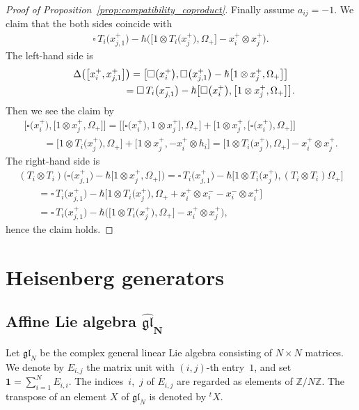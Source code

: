 \documentclass[pdftex]{sigma}
\theoremstyle{definition}
\numberwithin{equation}{section}
\newcommand{\bbZ}{\mathbb{Z}}
\newcommand{\gl}{\mathfrak{gl}}
\newcommand{\bfid}{\mathbf{1}}
\begin{document}
\begin{proof}[Proof of Proposition~\ref{prop:compatibility_coproduct}]
Finally assume $a_{ij}=-1$. We claim that the both sides coincide with
\begin{gather*}
\square\,T_i\big(x_{j,1}^+\big) -\hbar \big(\big[1 \otimes T_i\big(x_j^+\big), \Omega_+\big] - x_i^+ \otimes x_j^+\big).
\end{gather*}
The left-hand side is
\begin{gather*}
\Delta\big(\big[x_i^+, x_{j,1}^+\big]\big) = \big[\square\big(x_i^+\big), \square\big(x_{j,1}^+\big) - \hbar \big[1 \otimes x_j^+,\Omega_+\big]\big]\\
\hphantom{\Delta\big(\big[x_i^+, x_{j,1}^+\big]\big)}{} = \square\,T_i\big(x_{j,1}^-\big) - \hbar \big[\square\big(x_i^+\big),\big[1 \otimes x_j^+,\Omega_+\big]\big].
\end{gather*}
Then we see the claim by
\begin{gather*}
\big[\square\big(x_i^+\big),\big[1 \otimes x_j^+,\Omega_+\big]\big]=\big[\big[\square\big(x_i^+\big),1 \otimes x_j^+\big],\Omega_+\big] + \big[1 \otimes x_j^+,\big[\square\big(x_i^+\big),\Omega_+\big]\big] \\
\qquad {}= \big[1 \otimes T_i\big(x_j^+\big), \Omega_+\big] + \big[1 \otimes x_j^+, -x_i^+ \otimes h_i\big] = \big[1 \otimes T_i\big(x_j^+\big), \Omega_+\big] - x_i^+ \otimes x_j^+.
\end{gather*}
The right-hand side is
\begin{gather*}
(T_i \otimes T_i)\big(\square\big(x_{j,1}^+\big)-\hbar\big[1 \otimes x_j^+,\Omega_+\big]\big) = \square\,T_i\big(x_{j,1}^+\big) - \hbar\big[1 \otimes T_i\big(x_j^+\big), (T_i \otimes T_i)\Omega_+\big]\\
\qquad {}= \square\,T_i\big(x_{j,1}^+\big) - \hbar\big[1 \otimes T_i\big(x_j^+\big), \Omega_+ + x_i^+ \otimes x_i^- - x_i^- \otimes x_i^+\big]\\
\qquad{} = \square\,T_i\big(x_{j,1}^+\big) - \hbar\big(\big[1 \otimes T_i\big(x_j^+\big), \Omega_+\big] - x_i^+ \otimes x_j^+\big),
\end{gather*}
hence the claim holds.
\end{proof}

\section{Heisenberg generators}\label{section4}

\subsection[Affine Lie algebra $\hat{\gl}_N$]{Affine Lie algebra $\boldsymbol{\hat{\gl}_N}$}
Let $\gl_N$ be the complex general linear Lie algebra consisting of $N \times N$ matrices. We denote by $E_{i,j}$ the matrix unit with $(i,j)$-th entry~$1$, and set $\bfid = \sum\limits_{i=1}^N E_{i,i}$. The indices~$i$,~$j$ of $E_{i,j}$ are regarded as elements of $\bbZ/N\bbZ$. The transpose of an element $X$ of $\gl_N$ is denoted by ${}^t X$.
\end{document}
